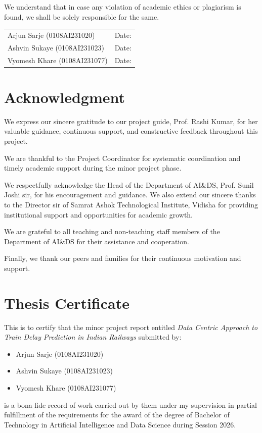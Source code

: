 \documentclass[12pt,a4paper]{report}
\newcommand{\projecttitle}{Data Centric Approach to Train Delay Prediction in Indian Railways}
\newcommand{\institutename}{Samrat Ashok Technological Institute, Vidisha}
\newcommand{\sessionname}{Session 2026}
\begin{document}
We understand that in case any violation of academic ethics or plagiarism is found, we shall be solely responsible for the same.

\vspace{1.5cm}
\begin{tabular}{p{}p{}}
Arjun Sarje (0108AI231020) & Date: \hrulefill \\
Ashvin Sukaye (0108AI231023) & Date: \hrulefill \\
Vyomesh Khare (0108AI231077) & Date: \hrulefill \\
\end{tabular}

\clearpage

\chapter*{Acknowledgment}
We express our sincere gratitude to our project guide, Prof. Rashi Kumar, for her valuable guidance, continuous support, and constructive feedback throughout this project.

We are thankful to the Project Coordinator for systematic coordination and timely academic support during the minor project phase.

We respectfully acknowledge the Head of the Department of AI\&DS, Prof. Sunil Joshi sir, for his encouragement and guidance. We also extend our sincere thanks to the Director sir of \institutename{} for providing institutional support and opportunities for academic growth.

We are grateful to all teaching and non-teaching staff members of the Department of AI\&DS for their assistance and cooperation.

Finally, we thank our peers and families for their continuous motivation and support.

\clearpage

\chapter*{Thesis Certificate}
This is to certify that the minor project report entitled \textit{\projecttitle} submitted by:
\begin{itemize}[leftmargin=2em]
    \item Arjun Sarje (0108AI231020)
    \item Ashvin Sukaye (0108AI231023)
    \item Vyomesh Khare (0108AI231077)
\end{itemize}
is a bona fide record of work carried out by them under my supervision in partial fulfillment of the requirements for the award of the degree of Bachelor of Technology in Artificial Intelligence and Data Science during \sessionname.
\end{document}
